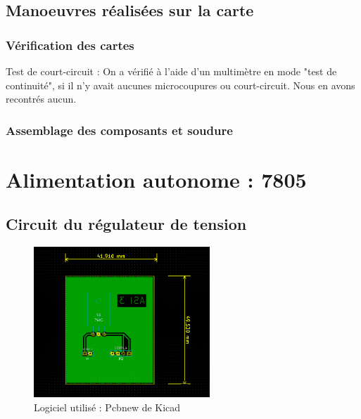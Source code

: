 \subsection{Manoeuvres réalisées sur la carte}
	\subsubsection{Vérification des cartes}
		Test de court-circuit : On a vérifié à l'aide d'un multimètre en mode "test de continuité", si il n'y avait aucunes microcoupures ou court-circuit. Nous en avons recontrés aucun.
	\subsubsection{Assemblage des composants et soudure}


\newpage

\section{Alimentation autonome : 7805}
\subsection{Circuit du régulateur de tension}
\begin{figure}[H]
	\centering
	\includegraphics[width=250px]{images/PCB.png}
	\caption{Logiciel utilisé : Pcbnew de Kicad}
\end{figure}

